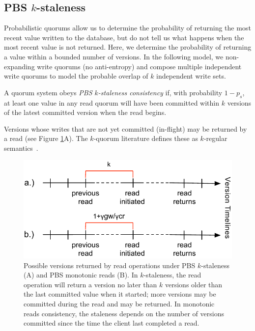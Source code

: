 \documentclass{vldb}
\newcommand{\subsectionskip}{-0em}
\begin{document}
\vspace{\subsectionskip}\subsection{PBS $k$-staleness}

Probabilistic quorums allow us to determine the probability of
returning the most recent value written to the database, but do not
tell us what happens when the most recent value is not returned.
Here, we determine the probability of returning a value within a
bounded number of versions.  In the following model, we non-expanding 
write quorums (no anti-entropy) and compose multiple independent write
quorums to model the probable overlap of $k$ independent write sets.
\begin{definition}
A quorum system obeys \textit{PBS $k$-staleness consistency} if, with
probability $1-p_{s}$, at least one value in any read quorum will
have been committed within $k$ versions of the latest committed
version when the read begins.
\end{definition}
Versions whose writes that are not yet committed (in-flight) may be
returned by a read (see Figure \ref{fig:timelines}A).  The $k$-quorum
literature defines these as $k$-regular semantics~\cite{non-strict}.

\begin{figure}
\centering
\includegraphics[width=\columnwidth]{figs/timelines.pdf}
\vspace{-16pt}
\caption{Possible versions returned by read operations under PBS
  $k$-staleness (A) and PBS monotonic reads (B). In $k$-staleness, the
  read operation will return a version no later than $k$ versions
  older than the last committed value when it started; more versions
  may be committed during the read and may be returned.  In monotonic
  reads consistency, the staleness depends on the number of versions
  committed since the time the client last completed a read.}
\vspace{-12pt}
\label{fig:timelines}
\end{figure}
\end{document}

